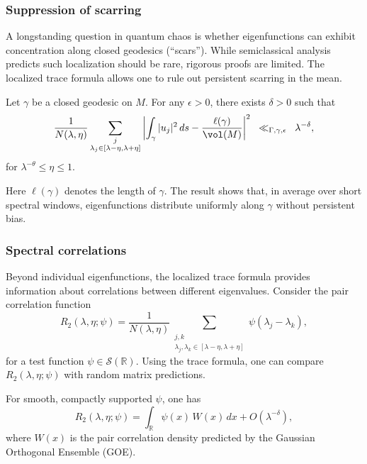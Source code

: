 \subsubsection{Suppression of scarring}

A longstanding question in quantum chaos is whether eigenfunctions can exhibit concentration along closed geodesics (“scars”). While semiclassical analysis predicts such localization should be rare, rigorous proofs are limited. The localized trace formula allows one to rule out persistent scarring in the mean.

\begin{proposition}\label{prop:scarring}
Let $\gamma$ be a closed geodesic on $M$. For any $\epsilon > 0$, there exists $\delta > 0$ such that
\[
\frac{1}{N(\lambda,\eta)} \sum_{\substack{j \\ \lambda_j \in [\lambda-\eta,\lambda+\eta]}} 
\left| \int_\gamma |u_j|^2 \, ds - \frac{\ell(\gamma)}{\vol(M)} \right|^2
\;\;\ll_{\Gamma,\gamma,\epsilon}\;\; \lambda^{-\delta},
\]
for $\lambda^{-\theta} \leq \eta \leq 1$.
\end{proposition}

Here $\ell(\gamma)$ denotes the length of $\gamma$. The result shows that, in average over short spectral windows, eigenfunctions distribute uniformly along $\gamma$ without persistent bias.

\subsubsection{Spectral correlations}

Beyond individual eigenfunctions, the localized trace formula provides information about correlations between different eigenvalues. Consider the pair correlation function
\[
R_2(\lambda,\eta;\psi) = \frac{1}{N(\lambda,\eta)} 
\sum_{\substack{j,k \\ \lambda_j,\lambda_k \in [\lambda-\eta,\lambda+\eta]}}
\psi(\lambda_j - \lambda_k),
\]
for a test function $\psi \in \mathcal{S}(\mathbb{R})$. Using the trace formula, one can compare $R_2(\lambda,\eta;\psi)$ with random matrix predictions.

\begin{theorem}\label{thm:correlations}
For smooth, compactly supported $\psi$, one has
\[
R_2(\lambda,\eta;\psi) = \int_\mathbb{R} \psi(x) \, W(x) \, dx + O(\lambda^{-\delta}),
\]
where $W(x)$ is the pair correlation density predicted by the Gaussian Orthogonal Ensemble (GOE).
\end{theorem}

